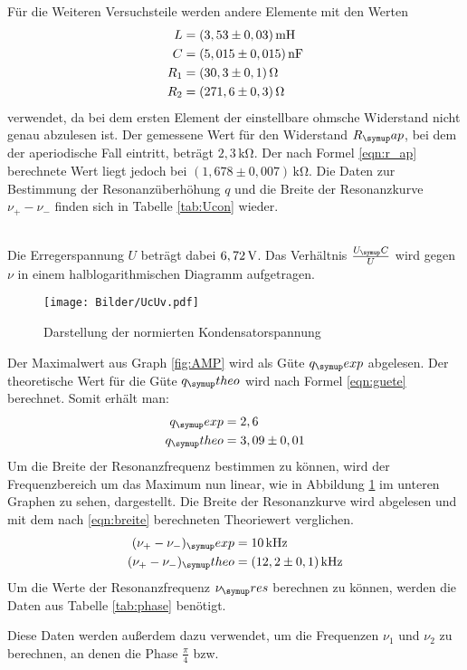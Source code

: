 Für die Weiteren Versuchsteile werden andere Elemente mit den Werten
\begin{align*}
  L &= (3,53 \pm 0,03) \,\si{\milli\henry} \\
  C &= (5,015 \pm 0,015) \,\si{\nano\farad} \\
  R_1 &= (30,3 \pm 0,1) \Ohm \\
  R_2 &= (271,6 \pm 0,3) \Ohm
\end{align*}
verwendet, da bei dem ersten Element der einstellbare ohmsche Widerstand nicht
genau abzulesen ist.
Der gemessene Wert für den Widerstand $R_\su{ap}$, bei dem der aperiodische Fall
eintritt, beträgt $2,3\,\si{\kilo\ohm}$. Der nach Formel \eqref{eqn:r_ap}
berechnete Wert liegt jedoch bei $(1,678 \pm 0,007)\,\si{\kilo\ohm}$.
Die Daten zur Bestimmung der Resonanzüberhöhung $q$ und die Breite der
Resonanzkurve $\nu_+ - \nu_-$ finden sich in Tabelle \ref{tab:Ucon} wieder.

\\
Die Erregerspannung $U$ beträgt dabei $6,72 \,\si{\volt}$.
Das Verhältnis $\frac{U_\su{C}}{U}$ wird gegen $\nu$ in einem halblogarithmischen
Diagramm aufgetragen.
\begin{figure}[h]
  \centering
  \texttt{[image: Bilder/UcUv.pdf]}
  \caption{Darstellung der normierten Kondensatorspannung}
  \label{fig:UcUv}
\end{figure}
Der Maximalwert aus Graph \ref{fig:AMP} wird als Güte $q_\su{exp}$ abgelesen. Der
theoretische Wert für die Güte $q_\su{theo}$ wird nach Formel \eqref{eqn:guete} berechnet.
Somit erhält man:
\begin{align*}
  q_\su{exp} &= 2,6 \\
  q_\su{theo} &= 3,09 \pm 0,01
\end{align*}
Um die Breite der Resonanzfrequenz bestimmen zu können, wird der Frequenzbereich
um das Maximum nun linear, wie in Abbildung \ref{fig:UcUv} im unteren Graphen
zu sehen, dargestellt. Die Breite der Resonanzkurve wird abgelesen und mit dem
nach \eqref{eqn:breite} berechneten Theoriewert verglichen.
\begin{align*}
  (\nu_+ - \nu_-)_\su{exp} &= 10\kHz \\
  (\nu_+ - \nu_-)_\su{theo}&= (12,2 \pm 0,1)\kHz
\end{align*}
Um die Werte der Resonanzfrequenz $\nu_\su{res}$ berechnen zu können, werden
die Daten aus Tabelle \ref{tab:phase} benötigt.

Diese Daten werden außerdem dazu verwendet, um die Frequenzen $\nu_1$ und
$\nu_2$ zu berechnen, an denen die Phase $\frac{\pi}{4}$ bzw.
